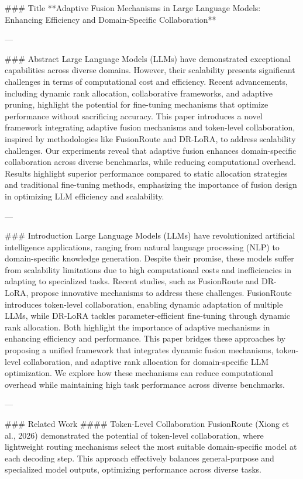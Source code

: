 ### Title  
**Adaptive Fusion Mechanisms in Large Language Models: Enhancing Efficiency and Domain-Specific Collaboration**

---

### Abstract  
Large Language Models (LLMs) have demonstrated exceptional capabilities across diverse domains. However, their scalability presents significant challenges in terms of computational cost and efficiency. Recent advancements, including dynamic rank allocation, collaborative frameworks, and adaptive pruning, highlight the potential for fine-tuning mechanisms that optimize performance without sacrificing accuracy. This paper introduces a novel framework integrating adaptive fusion mechanisms and token-level collaboration, inspired by methodologies like FusionRoute and DR-LoRA, to address scalability challenges. Our experiments reveal that adaptive fusion enhances domain-specific collaboration across diverse benchmarks, while reducing computational overhead. Results highlight superior performance compared to static allocation strategies and traditional fine-tuning methods, emphasizing the importance of fusion design in optimizing LLM efficiency and scalability.

---

### Introduction  
Large Language Models (LLMs) have revolutionized artificial intelligence applications, ranging from natural language processing (NLP) to domain-specific knowledge generation. Despite their promise, these models suffer from scalability limitations due to high computational costs and inefficiencies in adapting to specialized tasks. Recent studies, such as FusionRoute and DR-LoRA, propose innovative mechanisms to address these challenges. FusionRoute introduces token-level collaboration, enabling dynamic adaptation of multiple LLMs, while DR-LoRA tackles parameter-efficient fine-tuning through dynamic rank allocation. Both highlight the importance of adaptive mechanisms in enhancing efficiency and performance. This paper bridges these approaches by proposing a unified framework that integrates dynamic fusion mechanisms, token-level collaboration, and adaptive rank allocation for domain-specific LLM optimization. We explore how these mechanisms can reduce computational overhead while maintaining high task performance across diverse benchmarks.

---

### Related Work  
#### Token-Level Collaboration  
FusionRoute (Xiong et al., 2026) demonstrated the potential of token-level collaboration, where lightweight routing mechanisms select the most suitable domain-specific model at each decoding step. This approach effectively balances general-purpose and specialized model outputs, optimizing performance across diverse tasks.

